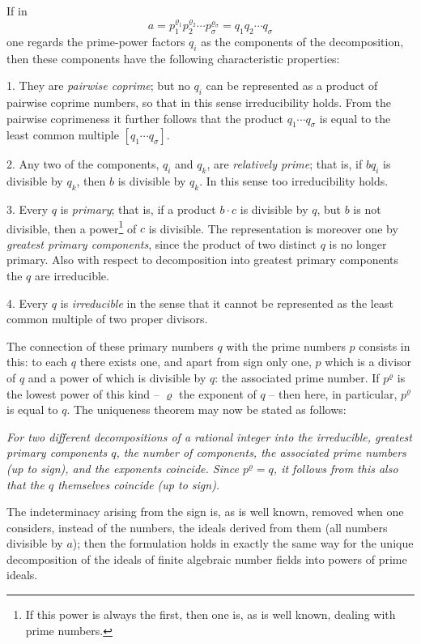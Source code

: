 \documentclass[11pt]{article}
\begin{document}
If in
\[
 a=p_1^{\varrho_1}p_2^{\varrho_2}\cdots p_\sigma^{\varrho_\sigma}=q_1q_2\cdots q_\sigma
\]
one regards the prime-power factors $q_i$ as the components of the decomposition, then these components have the following characteristic properties:

1. They are \emph{pairwise coprime}; but no $q_i$ can be represented as a product of pairwise coprime numbers, so that in this sense irreducibility holds. From the pairwise coprimeness it further follows that the product $q_1\cdots q_\sigma$ is equal to the least common multiple $[q_1\cdots q_\sigma]$.

2. Any two of the components, $q_i$ and $q_k$, are \emph{relatively prime}; that is, if $bq_i$ is divisible by $q_k$, then $b$ is divisible by $q_k$. In this sense too irreducibility holds.

3. Every $q$ is \emph{primary}; that is, if a product $b\cdot c$ is divisible by $q$, but $b$ is not divisible, then a power\footnote{If this power is always the first, then one is, as is well known, dealing with prime numbers.} of $c$ is divisible. The representation is moreover one by \emph{greatest primary components}, since the product of two distinct $q$ is no longer primary. Also with respect to decomposition into greatest primary components the $q$ are irreducible.

4. Every $q$ is \emph{irreducible} in the sense that it cannot be represented as the least common multiple of two proper divisors.

The connection of these primary numbers $q$ with the prime numbers $p$ consists in this: to each $q$ there exists one, and apart from sign only one, $p$ which is a divisor of $q$ and a power of which is divisible by $q$: the associated prime number. If $p^\varrho$ is the lowest power of this kind -- $\varrho$ the exponent of $q$ -- then here, in particular, $p^\varrho$ is equal to $q$. The uniqueness theorem may now be stated as follows:

\emph{For two different decompositions of a rational integer into the irreducible, greatest primary components $q$, the number of components, the associated prime numbers (up to sign), and the exponents coincide. Since $p^\varrho=q$, it follows from this also that the $q$ themselves coincide (up to sign).}

The indeterminacy arising from the sign is, as is well known, removed when one considers, instead of the numbers, the ideals derived from them (all numbers divisible by $a$); then the formulation holds in exactly the same way for the unique decomposition of the ideals of finite algebraic number fields into powers of prime ideals.
\end{document}
